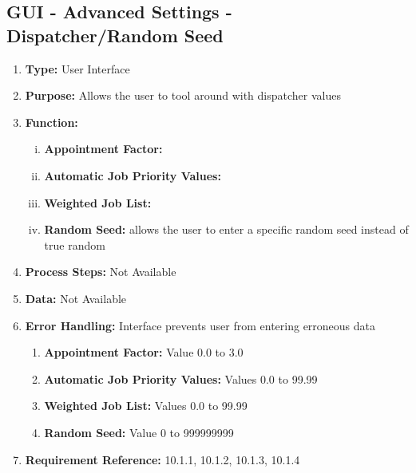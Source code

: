 \documentclass[paper=letter, fontsize=10pt]{scrartcl}
\numberwithin{equation}{section}		%
\numberwithin{figure}{section}			%
\numberwithin{table}{section}				%
\begin{document}
\subsection{GUI - Advanced Settings - Dispatcher/Random Seed}
\begin{enumerate}[]
	\item \textbf{Type:} User Interface
	\item \textbf{Purpose:} Allows the user to tool around with dispatcher values
	\item \textbf{Function:} 
	\begin{enumerate}[(i)]
		\item \textbf{Appointment Factor:} 
		\item \textbf{Automatic Job Priority Values:} 
		\item \textbf{Weighted Job List:} 
		\item \textbf{Random Seed:} allows the user to enter a specific random seed instead of true random
	\end{enumerate}
	\item \textbf{Process Steps:} Not Available
	\item \textbf{Data:} Not Available
	\item \textbf{Error Handling:} Interface prevents user from entering erroneous data 
	\begin{enumerate}[]
		\item \textbf{Appointment Factor:} Value 0.0 to 3.0
		\item \textbf{Automatic Job Priority Values:} Values 0.0 to 99.99
		\item \textbf{Weighted Job List:} Values 0.0 to 99.99
		\item \textbf{Random Seed:} Value 0 to 999999999
	\end{enumerate}
	\item \textbf{Requirement Reference:} 10.1.1, 10.1.2, 10.1.3, 10.1.4
\end{enumerate}
\end{document}
